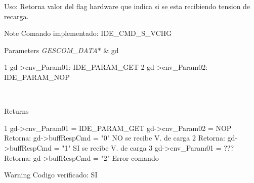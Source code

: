 Uso\+: Retorna valor del flag hardware que indica si se esta recibiendo tension de recarga. 



 \begin{DoxyNote}{Note}
Comando implementado\+: I\+D\+E\+\_\+\+C\+M\+D\+\_\+\+S\+\_\+\+V\+C\+HG
\end{DoxyNote}

\begin{DoxyParams}{Parameters}
{\em G\+E\+S\+C\+O\+M\+\_\+\+D\+A\+T\+A$\ast$} & gd 
\begin{DoxyCode}
1 gd->cnv\_Param01: IDE\_PARAM\_GET
2 gd->cnv\_Param02: IDE\_PARAM\_NOP
\end{DoxyCode}
\\
\hline
\end{DoxyParams}
\begin{DoxyReturn}{Returns}

\begin{DoxyCode}
1 gd->cnv\_Param01 = IDE\_PARAM\_GET gd->cnv\_Param02 = NOP Retorna: gd->buffRespCmd = "0"  NO se recibe V. de
       carga
2                                                       Retorna: gd->buffRespCmd = "1"  SI se recibe V. de
       carga
3 gd->cnv\_Param01 = ???                                 Retorna: gd->buffRespCmd = "2"  Error comando
\end{DoxyCode}

\end{DoxyReturn}
\begin{DoxyWarning}{Warning}
Codigo verificado\+: SI 

 
\end{DoxyWarning}
